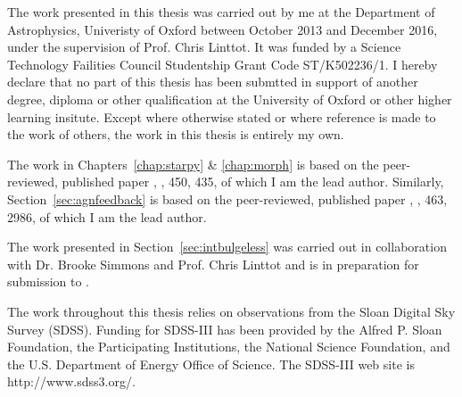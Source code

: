 \documentclass[12pt,useAMS]{ociamthesis}  %
\begin{document}
\begin{originality}
The work presented in this thesis was carried out by me at the Department of Astrophysics, Univeristy of Oxford between October 2013 and December 2016, under the supervision of Prof. Chris Linttot. It was funded by a Science Technology Failities Council Studentship Grant Code ST/K502236/1. I hereby declare that no part of this thesis has been submtted in support of another degree, diploma or other qualification at the University of Oxford or other higher learning insitute. Except where otherwise stated or where reference is made to the work of others, the work in this thesis is entirely my own.

The work in Chapters~\ref{chap:starpy} \& \ref{chap:morph} is based on the peer-reviewed, published paper \citealt{smethurst15}, \mnras, 450, 435, of which I am the lead author. Similarly, Section~\ref{sec:agnfeedback} is based on the peer-reviewed, published paper \citealt{smethurst16}, \mnras, 463, 2986, of which I am the lead author. 

The work presented in Section~\ref{sec:intbulgeless} was carried out in collaboration with Dr. Brooke Simmons and Prof. Chris Linttot and is in preparation for submission to \mnras.

The work throughout this thesis relies on observations from the Sloan Digital Sky Survey (SDSS). Funding for SDSS-III has been provided by the Alfred P. Sloan Foundation, the Participating Institutions, the National Science Foundation, and the U.S. Department of Energy Office of Science. The SDSS-III web site is http://www.sdss3.org/.



\end{originality}
\end{document}
